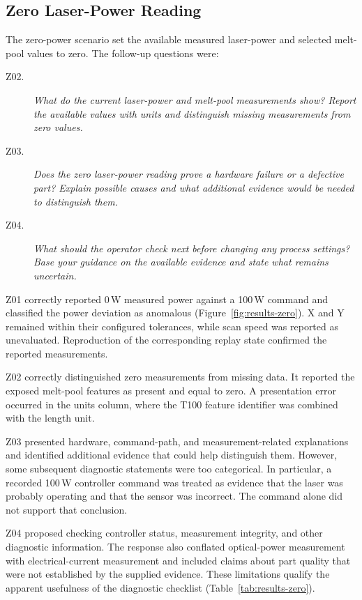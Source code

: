 \subsection{Zero Laser-Power Reading}
\label{sec:results-zero}

The zero-power scenario set the available measured laser-power and selected melt-pool values to zero. The follow-up questions were:
\begin{description}
\item[Z02.] \textit{What do the current laser-power and melt-pool measurements show? Report the available values with units and distinguish missing measurements from zero values.}
\item[Z03.] \textit{Does the zero laser-power reading prove a hardware failure or a defective part? Explain possible causes and what additional evidence would be needed to distinguish them.}
\item[Z04.] \textit{What should the operator check next before changing any process settings? Base your guidance on the available evidence and state what remains uncertain.}
\end{description}

Z01 correctly reported 0\,W measured power against a 100\,W command and classified the power deviation as anomalous (Figure~\ref{fig:results-zero}). X and Y remained within their configured tolerances, while scan speed was reported as unevaluated. Reproduction of the corresponding replay state confirmed the reported measurements.

Z02 correctly distinguished zero measurements from missing data. It reported the exposed melt-pool features as present and equal to zero. A presentation error occurred in the units column, where the T100 feature identifier was combined with the length unit.

Z03 presented hardware, command-path, and measurement-related explanations and identified additional evidence that could help distinguish them. However, some subsequent diagnostic statements were too categorical. In particular, a recorded 100\,W controller command was treated as evidence that the laser was probably operating and that the sensor was incorrect. The command alone did not support that conclusion.

Z04 proposed checking controller status, measurement integrity, and other diagnostic information. The response also conflated optical-power measurement with electrical-current measurement and included claims about part quality that were not established by the supplied evidence. These limitations qualify the apparent usefulness of the diagnostic checklist (Table~\ref{tab:results-zero}).

